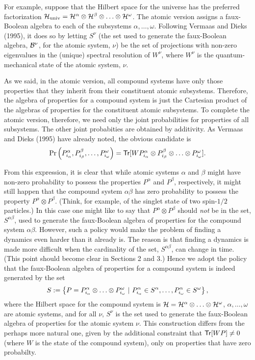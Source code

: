 \documentclass[12pt]{article}
\newcommand{\be}{\vspace*{6pt} \begin{equation}}
\newcommand{\ee}{\vspace*{10pt} \end{equation}}
\newcommand{\cH}{\cal{H}}                                       %
\newcommand{\cB}{\cal{B}}                                       %
\newcommand{\ga}{\alpha}                                        %
\newcommand{\gb}{\beta}                                         %
\newcommand{\gab}{\alpha\beta}                                  %
\newcommand{\gn}{\nu}                                           %
\newcommand{\gw}{\omega}                                        %
\newcommand{\Tr}[1]{\mbox{{\sf Tr}$[#1]$}}                      %
\begin{document}
For example, suppose that the Hilbert space for the universe has the
preferred factorization $\cH_{\mbox{{\scriptsize univ}}} = \cH^{\ga}
\otimes \cH^{\gb} \otimes \ldots \otimes \cH^{\gw}$. The atomic version
assigns a faux-Boolean algebra to each of the subsystems $\ga , \ldots 
, \gw$.  Following Vermaas and Dieks (1995), it does so by letting 
$S^{\gn}$ (the set used to generate the faux-Boolean algebra, 
${\cB}^{\gn}$, for the atomic system, $\gn$) be the set of projections 
with non-zero eigenvalues in the (unique) spectral resolution of 
$W^{\gn}$, where $W^{\gn}$ is the quantum-mechanical state of the 
atomic system, $\gn$.

As we said, in the atomic version, all compound systems have only
those properties that they inherit from their constituent atomic
subsystems.  Therefore, the algebra of properties for a compound
system is just the Cartesian product of the algebras of properties for
the constituent atomic subsystems.  To complete the atomic version,
therefore, we need only the joint probabilities for properties of all
subsystems.  The other joint probabities are obtained by additivity.  As
Vermaas and Dieks (1995) have already noted, the obvious candidate is
\be
\Pr \left( { P^{\ga}_{i_\ga}, P^{\gb}_{i_\gb}, \ldots , P^{\gw}_{i_\gw}}
\right) =
\Tr{WP^{\ga}_{i_\ga} \otimes P^{\gb}_{i_\gb} \otimes \ldots \otimes
P^{\gw}_{i_\gw}}.
\ee

From this expression, it is clear that while atomic systems $\ga$ and
$\gb$ might have non-zero probability to possess the properties
$P^{\ga}$ and $P^{\gb}$, respectively, it might still happen that the
compound system $\gab$ has zero probability to possess the property
$P^{\ga}\otimes P^{\gb}$.  (Think, for example, of the singlet state
of two spin-$1/2$ particles.) In this case one might like to say that
$P^{\ga}\otimes P^{\gb}$ should {\it not} be in the set, $S^{\gab}$,
used to generate the faux-Boolean algebra of properties for the
compound system $\gab$.  However, such a policy would make the problem
of finding a dynamics even harder than it already is.  The reason is
that finding a dynamics is made more difficult when the cardinality of
the set, $S^{\gab}$, can change in time.  (This point should become
clear in Sections 2 and 3.) Hence we adopt the policy that the
faux-Boolean algebra of properties for a compound system is indeed
generated by the set
\be
\label{eq:composite}
S := \left\{ { P = P^{\ga}_{i_{\ga}} \otimes \ldots \otimes
P^{\gw}_{i_{\gw}}\ |\ P^{\ga}_{i_{\ga}} \in S^{\ga}, \ldots ,
P^{\ga}_{i_{\gw}} \in S^{\gw} } \right\},
\ee
where the Hilbert space for the compound system is $\cH = \cH^{\ga}
\otimes \ldots \otimes \cH^{\gw}$, $\ga, \ldots , \gw$ are atomic systems,
and for all $\gn$, $S^{\gn}$ is the set used to generate the faux-Boolean
algebra of properties for the atomic system $\gn$.  This construction
differs from the perhaps more natural one, given by the additional
constraint that $\Tr{WP} \neq 0$ (where $W$ is the state of the
compound system), only on properties that have zero probabilty.
\end{document}

